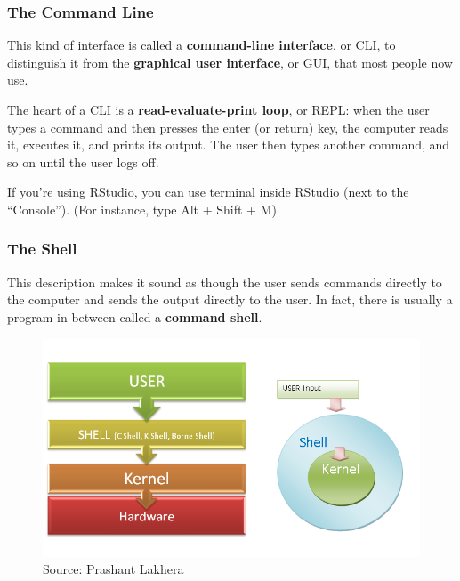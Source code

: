 \documentclass[
  letterpaper,
  DIV=11,
  numbers=noendperiod]{scrreprt}
\begin{document}
\hypertarget{the-command-line-1}{%
\subsubsection*{The Command Line}\label{the-command-line-1}}

This kind of interface is called a \textbf{command-line interface}, or
CLI, to distinguish it from the \textbf{graphical user interface}, or
GUI, that most people now use.

The heart of a CLI is a \textbf{read-evaluate-print loop}, or REPL: when
the user types a command and then presses the enter (or return) key, the
computer reads it, executes it, and prints its output. The user then
types another command, and so on until the user logs off.

If you're using RStudio, you can use terminal inside RStudio (next to
the ``Console''). (For instance, type Alt + Shift + M)

\hypertarget{the-shell}{%
\subsubsection*{The Shell}\label{the-shell}}

This description makes it sound as though the user sends commands
directly to the computer and sends the output directly to the user. In
fact, there is usually a program in between called a \textbf{command
shell}.

\begin{figure}

{\centering \includegraphics{./images/shell.png}

}

\caption{Source: Prashant Lakhera}

\end{figure}
\end{document}
